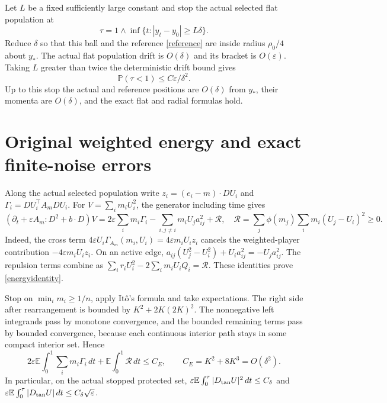 \documentclass[11pt,a4paper]{article}
\newcommand{\E}{\mathbb E}
\newcommand{\PP}{\mathbb P}
\newcommand{\dt}{\,dt}
\begin{document}
Let $L$ be a fixed sufficiently large constant and stop the actual
selected flat population at
\[
 \tau=1\wedge\inf\{t:|y_t-y_0|\geq L\delta\}.
\]
Reduce $\delta$ so that this ball and the reference
\eqref{reference} are inside radius $\rho_0/4$ about $y_*$.
The actual flat population drift is $O(\delta)$ and its bracket is
$O(\varepsilon)$. Taking $L$ greater than twice the deterministic
drift bound gives
\begin{equation}\label{localexit}
 \PP(\tau<1)\leq C\varepsilon/\delta^2.
\end{equation}
Up to this stop the actual and reference positions are $O(\delta)$
from $y_*$, their momenta are $O(\delta)$, and the exact flat and
radial formulas hold.

\section{Original weighted energy and exact finite-noise errors}
Along the actual selected population write
$z_i=(e_i-m)\cdot DU_i$ and
$\Gamma_i=DU_i^\top A_mDU_i$. For
$V=\sum_i m_iU_i^2$, the generator including time gives
\begin{equation}\label{energyidentity}
 (\partial_t+\varepsilon A_m:D^2+b\cdot D)V
 =2\varepsilon\sum_i m_i\Gamma_i
   -\sum_{i,j\ne i}m_iU_j a_{ij}^2
   +\mathcal R,
 \quad
 \mathcal R=\sum_j\phi(m_j)\sum_i m_i(U_j-U_i)^2\geq0.
\end{equation}
Indeed, the cross term
$4\varepsilon U_i\Gamma_{A_m}(m_i,U_i)
=4\varepsilon m_iU_iz_i$ cancels the weighted-player contribution
$-4\varepsilon m_iU_iz_i$. On an active edge,
$a_{ij}(U_j^2-U_i^2)+U_ia_{ij}^2=-U_ja_{ij}^2$.
The repulsion terms combine as
$\sum_i r_iU_i^2-2\sum_i m_iU_iQ_i=\mathcal R$.
These identities prove \eqref{energyidentity}.

Stop on $\min_i m_i\geq1/n$, apply It\^o's formula and take expectations.
The right side after rearrangement is bounded by
$K^2+2K(2K)^2$. The nonnegative left integrands pass by monotone
convergence, and the bounded remaining terms pass by bounded
convergence, because each continuous interior path stays in some
compact interior set. Hence
\begin{equation}\label{energybound}
 2\varepsilon\E\int_0^1\sum_i m_i\Gamma_i\dt
          +\E\int_0^1\mathcal R\dt\leq C_E,
 \qquad C_E=K^2+8K^3=O(\delta^2).
\end{equation}
In particular, on the actual stopped protected set,
$\varepsilon\E\int_0^\tau|D_{\rm tan}U|^2\dt\leq C_\delta$ and
$\varepsilon\E\int_0^\tau|D_{\rm tan}U|\dt\leq C_\delta\sqrt\varepsilon$.
\end{document}
